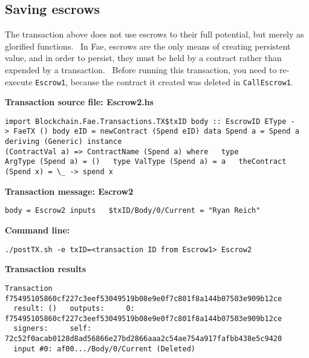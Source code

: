 \documentclass[11pt]{article}
\newcommand{\codeblock}[1]{\begin{mdframed}[
    backgroundcolor=header-color,
    linecolor=header-color,
    innertopmargin=10pt,
    ]{\texttt{#1}}\end{mdframed}}
\begin{document}
\subsection{Saving escrows}
\vspace{5.5pt}

The transaction above does not use escrows to their full potential, but merely as glorified functions.  In Fae, escrows are the only means of creating persistent value, and in order to persist, they must be held by a contract rather than expended by a transaction.  Before running this transaction, you need to re-execute \texttt{Escrow1}, because the contract it created was deleted in \texttt{CallEscrow1}.


\vspace{11pt}

\textbf{Transaction source file: Escrow2.hs}

\codeblock{import Blockchain.Fae.Transactions.TX\$txID\newline
\newline
body :: EscrowID EType -\textgreater{} FaeTX ()\newline
body eID = newContract (Spend eID)\newline
\newline
data Spend a = Spend a deriving (Generic)\newline
\newline
instance (ContractVal a) =\textgreater{} ContractName (Spend a) where\newline
  type ArgType (Spend a) = ()\newline
  type ValType (Spend a) = a\newline
  theContract (Spend x) = \textbackslash{}\_ -\textgreater{} spend x}

\textbf{Transaction message: Escrow2}

\codeblock{body = Escrow2\newline
inputs\newline
  \$txID\slash{}Body\slash{}0\slash{}Current = "Ryan Reich"}

\textbf{Command line:}

\codeblock{.\slash{}postTX.sh -e txID=\textless{}transaction ID from Escrow1\textgreater{} Escrow2}

\textbf{Transaction results}

\codeblock{Transaction f75495105860cf227c3eef53049519b08e9e0f7c801f8a144b07503e909b12ce\newline
  result: ()\newline
  outputs:\newline
    0: f75495105860cf227c3eef53049519b08e9e0f7c801f8a144b07503e909b12ce\newline
  signers:\newline
    self: 72c52f0acab0128d8ad56866e27bd2866aaa2c54ae754a917fafbb438e5c9420\newline
  input \#0: af00...\slash{}Body\slash{}0\slash{}Current (Deleted)}
\end{document}
